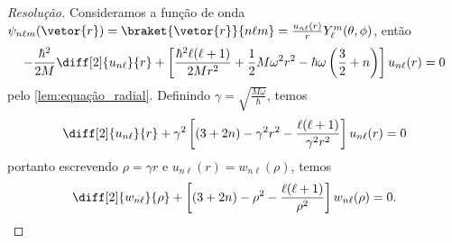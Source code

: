 \begin{proof}[Resolução]
    Consideramos a função de onda \(\psi_{n\ell m}(\vetor{r}) = \braket{\vetor{r}}{n \ell m} = \frac{u_{n\ell}(r)}{r} Y_\ell^m(\theta, \phi)\), então
    \begin{equation*}
        -\frac{\hbar^2}{2M}\diff[2]{u_{n\ell}}{r} + \left[\frac{\hbar^2\ell(\ell + 1)}{2M r^2} + \frac12 M \omega^2 r^2 - \hbar\omega \left(\frac{3}{2} + n\right)\right]u_{n \ell}(r) = 0
    \end{equation*}
    pelo \cref{lem:equação_radial}. Definindo \(\gamma = \sqrt{\frac{M \omega}{\hbar}}\), temos
    \begin{equation*}
        \diff[2]{u_{n\ell}}{r} + \gamma^2\left[(3 + 2n) - \gamma^2r^2 - \frac{\ell(\ell + 1)}{\gamma^2r^2}\right]u_{n \ell}(r) = 0
    \end{equation*}
    portanto escrevendo \(\rho = \gamma r\) e \(u_{n\ell}(r) = w_{n \ell}(\rho)\), temos
    \begin{equation*}
        \diff[2]{w_{n\ell}}{\rho} + \left[(3 + 2n)- \rho^2 - \frac{\ell(\ell + 1)}{\rho^2}\right]w_{n \ell}(\rho) = 0.

\end{equation*}
\end{proof}
